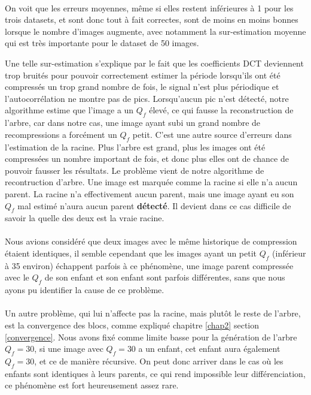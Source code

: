 \documentclass[utf8,final]{stageM2R} %
\begin{document}
\paragraph{}
On voit que les erreurs moyennes, même si elles restent inférieures à 1 pour les trois datasets, et sont donc tout à fait correctes, sont de moins en moins bonnes lorsque le nombre d'images augmente, avec notamment la sur-estimation moyenne qui est très importante pour le dataset de 50 images.

Une telle sur-estimation s'explique par le fait que les coefficients DCT deviennent trop bruités pour pouvoir correctement estimer la période lorsqu'ils ont été compressés un trop grand nombre de fois, le signal n'est plus périodique et l'autocorrélation ne montre pas de pics. Lorsqu'aucun pic n'est détecté, notre algorithme estime que l'image a un $Q_f$ élevé, ce qui fausse la reconstruction de l'arbre, car dans notre cas, une image ayant subi un grand nombre de recompressions a forcément un $Q_f$ petit. C'est une autre source d'erreurs dans l'estimation de la racine. Plus l'arbre est grand, plus les images ont été compressées un nombre important de fois, et donc plus elles ont de chance de pouvoir fausser les résultats. Le problème vient de notre algorithme de recontruction d'arbre. Une image est marquée comme la racine si elle n'a aucun parent. La racine n'a effectivement aucun parent, mais une image ayant eu son $Q_f$ mal estimé n'aura aucun parent \textbf{détecté}. Il devient dans ce cas difficile de savoir la quelle des deux est la vraie racine.
\paragraph{}

Nous avions considéré que deux images avec le même historique de compression étaient identiques, il semble cependant que les images ayant un petit $Q_f$ (inférieur à 35 environ) échappent parfois à ce phénomène, une image parent compressée avec le $Q_f$ de son enfant et son enfant sont parfois différentes, sans que nous ayons pu identifier la cause de ce problème.
\paragraph{}

Un autre problème, qui lui n'affecte pas la racine, mais plutôt le reste de l'arbre, est la convergence des blocs, comme expliqué chapitre \ref{chap2} section \ref{convergence}. Nous avons fixé comme limite basse pour la génération de l'arbre $Q_f = 30$, si une image avec $Q_f = 30$ a un enfant, cet enfant aura également $Q_f = 30$, et ce de manière récursive. On peut donc arriver dans le cas où les enfants sont identiques à leurs parents, ce qui rend impossible leur différenciation, ce phénomène est fort heureusement assez rare.
\end{document}
